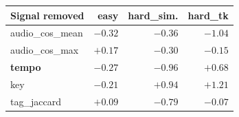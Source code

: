 \setlength{\tabcolsep}{4pt}
\begin{tabular}{@{}l r r r@{}}
\toprule
\textbf{Signal removed} & \textbf{easy} & \textbf{hard\_sim.} & \textbf{hard\_tk} \\
\midrule
audio\_cos\_mean & $-0.32$ & $-0.36$ & $-1.04$ \\
audio\_cos\_max  & $+0.17$ & $-0.30$ & $-0.15$ \\
\textbf{tempo}   & $-0.27$ & $\mathbf{-0.96}$ & $\mathbf{+0.68}$ \\
key              & $-0.21$ & $+0.94$ & $+1.21$ \\
tag\_jaccard     & $+0.09$ & $-0.79$ & $-0.07$ \\
\bottomrule
\end{tabular}
